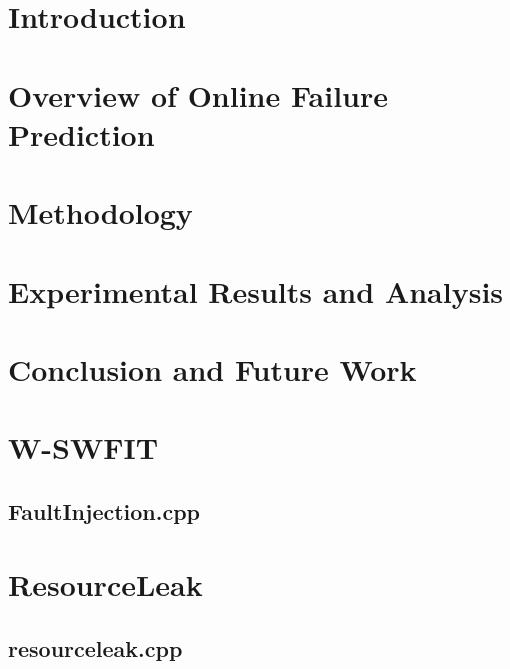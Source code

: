 \documentclass[12pt,letterpaper,oneside]{book}
\begin{document}
\frontmatter
	\flyleaf                        
	\disclaimerpage                 
	\titlepageAFIT                      
	\committeepage  
	
	
	\tableofcontents
	\listoffigures
	\listoftables
\mainmatter
\chapter{Introduction} \label{chapter1}


\chapter{Overview of Online Failure Prediction} \label{chapter2}


\chapter{Methodology} \label{chapter3}


\chapter{Experimental Results and Analysis} \label{chapter4}


\chapter{Conclusion and Future Work} \label{chapter5}

\appendix
\chapter{W-SWFIT}
\section{FaultInjection.cpp} \label{app:w-swfit}


\chapter{ResourceLeak}
\section{resourceleak.cpp} \label{app:resourceLeak}

\backmatter
	\singlespace
	
	 
	
	\clearpage
\end{document}
